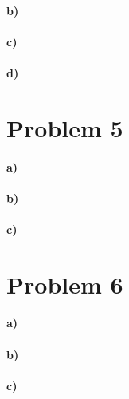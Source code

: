 \documentclass[12pt]{article}
\begin{document}
\paragraph{b)}

\paragraph{c)}

\paragraph{d)}

\section*{Problem 5}

\paragraph{a)}

\paragraph{b)}

\paragraph{c)}

\section*{Problem 6}

\paragraph{a)}

\paragraph{b)}

\paragraph{c)}
\end{document}
